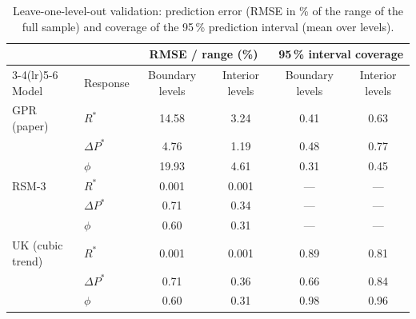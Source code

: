 \begin{table}[htbp]\centering\small\setlength{\tabcolsep}{5pt}
\caption{Leave-one-level-out validation: prediction error (RMSE in \% of the range of the full sample) and coverage of the 95\,\% prediction interval (mean over levels).}\label{tab:ch-e1}
\begin{tabular}{llcccc}\toprule
 & & \multicolumn{2}{c}{RMSE / range (\%)} & \multicolumn{2}{c}{95\,\% interval coverage}\\\cmidrule(lr){3-4}\cmidrule(lr){5-6}
Model & Response & Boundary levels & Interior levels & Boundary levels & Interior levels\\\midrule
GPR (paper) & $R^*$ & 14.58 & 3.24 & 0.41 & 0.63\\
 & $\Delta P^*$ & 4.76 & 1.19 & 0.48 & 0.77\\
 & $\phi$ & 19.93 & 4.61 & 0.31 & 0.45\\\midrule
RSM-3 & $R^*$ & 0.001 & 0.001 & --- & ---\\
 & $\Delta P^*$ & 0.71 & 0.34 & --- & ---\\
 & $\phi$ & 0.60 & 0.31 & --- & ---\\\midrule
UK (cubic trend) & $R^*$ & 0.001 & 0.001 & 0.89 & 0.81\\
 & $\Delta P^*$ & 0.71 & 0.36 & 0.66 & 0.84\\
 & $\phi$ & 0.60 & 0.31 & 0.98 & 0.96\\\bottomrule
\end{tabular}
\end{table}

